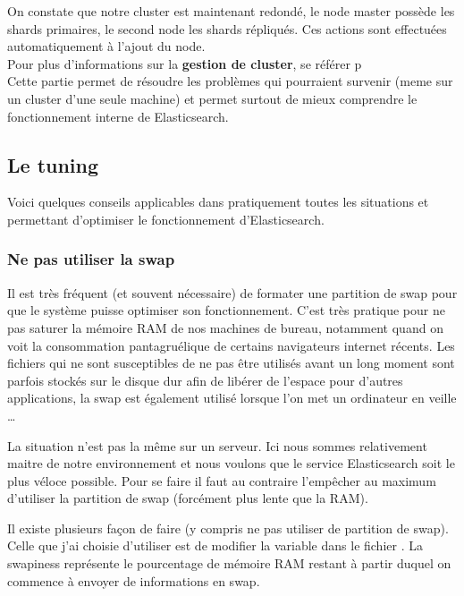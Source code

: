 {On constate que notre cluster est maintenant redondé, le node master possède les 
shards primaires, le second node les shards répliqués. Ces actions sont effectuées
automatiquement à l'ajout du node.\\[2mm]

Pour plus d'informations sur la \textbf{gestion de cluster}, se référer p\pageref{subsec:elasticcluster}\\[2mm]


Cette partie permet de résoudre les problèmes qui pourraient survenir (meme sur
un cluster d'une seule machine) et permet surtout de mieux comprendre le fonctionnement
interne de Elasticsearch.

\subsection{Le tuning}
\label{subsec:elastictuning}
Voici quelques conseils applicables dans pratiquement toutes les situations et 
permettant d'optimiser le fonctionnement d'Elasticsearch.

\subsubsection{Ne pas utiliser la swap}
Il est très fréquent (et souvent nécessaire) de formater une partition de swap pour
que le système puisse optimiser son fonctionnement. C'est très pratique pour ne pas
saturer la mémoire RAM de nos machines de bureau, notamment quand on voit la consommation
pantagruélique de certains navigateurs internet récents. Les fichiers qui ne sont 
susceptibles de ne pas être utilisés avant un long moment sont parfois stockés sur le
disque dur afin de libérer de l'espace pour d'autres applications, la swap est
également utilisé lorsque l'on met un ordinateur en veille \ldots

La situation n'est pas la même sur un serveur. Ici nous sommes relativement maitre
de notre environnement et nous voulons que le service Elasticsearch soit 
le plus véloce possible. Pour se faire il faut au contraire l'empêcher au maximum 
d'utiliser la partition de swap (forcément plus lente que la RAM).

Il existe plusieurs façon de faire (y compris ne pas utiliser de partition de swap).
Celle que j'ai choisie d'utiliser est de modifier la variable 
dans le fichier . La swapiness représente le pourcentage
de mémoire RAM restant à partir duquel on commence à envoyer de informations en
swap.

}
